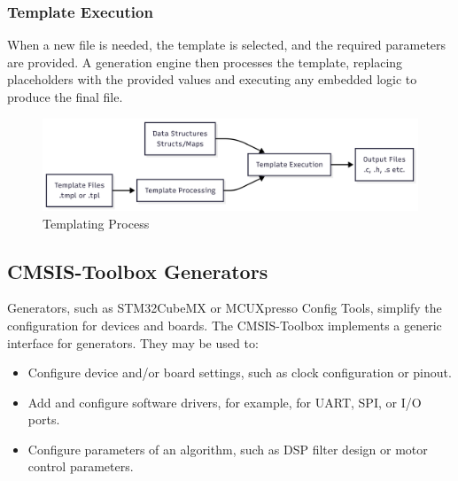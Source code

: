 \subsubsection{Template Execution}
When a new file is needed, the template is selected, and the required parameters are provided. A generation engine then processes the template, replacing placeholders with the provided values and executing any embedded logic to produce the final file.
\begin{figure}[H]
	\centering
	\includegraphics[width=15cm]{img/ST_Summer_Internship/template_workflow.png}
	\caption{Templating Process}
	\label{fig:tempalte_proc}
\end{figure}

\subsection{CMSIS-Toolbox Generators}
Generators, such as STM32CubeMX or MCUXpresso Config Tools, simplify the configuration for devices and boards. The CMSIS-Toolbox implements a generic interface for generators. They may be used to:
\begin{itemize}
	\item Configure device and/or board settings, such as clock configuration or pinout.
	\item Add and configure software drivers, for example, for UART, SPI, or I/O ports.
	\item Configure parameters of an algorithm, such as DSP filter design or motor control parameters.
\end{itemize}
